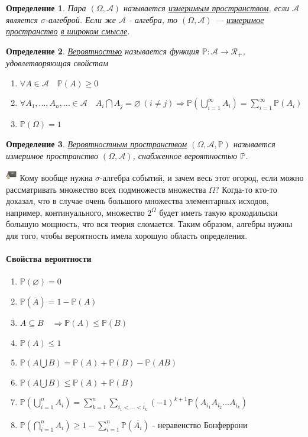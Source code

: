 \documentclass[12pt]{article}
\newtheorem{Def}{Определение}
\newenvironment{Wtf}{\includegraphics[height=5mm]{ping}}{}
\numberwithin{Th}{section}
\numberwithin{Def}{section}
\numberwithin{Lem}{section}
\numberwithin{St}{section}
\numberwithin{equation}{section}
\newcommand\Pro{\mathbb{P}} %
\newcommand\Ev{\mathscr{A}} %
\begin{document}
\begin{Def}
Пара $(\Omega, \Ev)$ называется \underline{измеримым пространством}, если $\Ev$ является $\sigma$-алгеброй. Если же $\Ev$ - алгебра, то  $(\Omega, \Ev)$ --- \underline{измеримое пространство} \underline{ в широком смысле}.
\end{Def}

\begin{Def}
\underline{Вероятностью} называется функция $\Pro \colon \Ev\rightarrow \mathscr{R}_+$, удовлетворяющая свойстам
\begin{enumerate}
	\item $\forall A \in \Ev \quad \Pro (A) \ge 0$
	\item $\forall A_1, \dots, A_n, \ldots \in \Ev \quad A_i \bigcap A_j  = \varnothing\  (i \not= j)  \Rightarrow \Pro (\bigcup\limits_{i=1}^{\infty} A_i) = \sum\limits_{i = 1}^{\infty}\Pro( A_i)$
	\item $\Pro (\Omega) = 1$
\end{enumerate}
\end{Def}

\begin{Def}
\underline{Вероятностным пространством} $(\Omega, \Ev, \Pro)$ называется измеримое пространство $(\Omega, \Ev)$, снабженное вероятностью $\Pro$.
\end{Def}
\begin{Wtf}
Кому вообще нужна $\sigma$-алгебра событий, и зачем весь этот огород, если можно рассматривать множество всех подмножеств множества $\Omega$? Когда-то кто-то доказал, что в случае очень большого множества элементарных исходов, например, континуального, множество $2^{\Omega}$ будет иметь такую крокодильски большую мощность, что вся теория сломается. Таким образом, алгебры нужны для того, чтобы вероятность имела хорошую область определения.
\end{Wtf}

\paragraph{Свойства вероятности}
\begin{enumerate}
	\item $\Pro (\varnothing) = 0$ 
	\item $\Pro (\overline{A}) = 1 - \Pro (A)$
	\item $A \subseteq B \quad \Rightarrow \Pro (A) \le \Pro (B)$
	\item $\Pro (A) \le 1$
	\item $\Pro (A \bigcup B) = \Pro (A) + \Pro (B) - \Pro (AB)$ 
	\item $\Pro (A \bigcup B) \le \Pro (A) + \Pro (B)$ 
	\item $\Pro (\bigcup\limits_{i=1}^{n} A_i) = \sum\limits_{k=1}^{n} \sum\limits_{i_1<\dots <i_k} (-1)^{k+1} \Pro(A_{i_1}A_{i_2}\ldots A_{i_k})$
	\item $\Pro (\bigcap\limits_{i=1}^{n} A_i) \ge 1 - \sum\limits_{i=1}^{n} \Pro (\overline{A_i})$ - неравенство Бонферрони
\end{enumerate}
\end{document}
